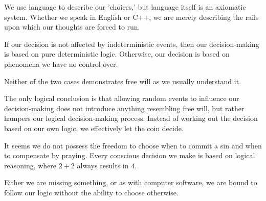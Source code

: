 We use language to describe our 'choices,' but language itself is an axiomatic system.
Whether we speak in English or C++, we are merely describing the rails upon which our thoughts are forced to run.

If our decision is not affected by indeterministic events, then
our decision-making is based on pure deterministic logic. Otherwise, our decision is based on phenomena we have no control over. 
  
Neither of the two cases demonstrates free will as we usually understand it.
  
The only logical conclusion is that allowing random events to
influence our decision-making does not introduce anything resembling free will, but rather hampers our logical
decision-making process. Instead of working out the decision based
on our own logic, we effectively let the coin decide.
  
It seems we do not possess the freedom to choose when to commit a sin and when to compensate by
praying. Every conscious decision we make is based on logical
reasoning, where $2+2$ always results in $4$.

Either we are missing something, or as with computer software, we are bound to follow our logic without the ability to choose otherwise.

